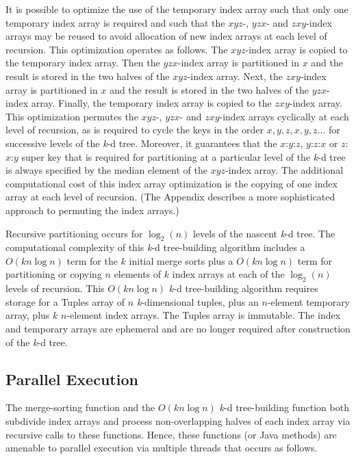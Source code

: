\documentclass{sig-alternate}
\begin{document}
It is possible to optimize the use of the temporary index array such that only one temporary index array is required and such that the $xyz$-, $yzx$- and $zxy$-index arrays may be reused to avoid allocation of new index arrays at each level of recursion.  This optimization operates as follows.  The $xyz$-index array is copied to the temporary index array.  Then the $yzx$-index array is partitioned in $x$ and the result is stored in the two halves of the $xyz$-index array.  Next, the $zxy$-index array is partitioned in $x$ and the result is stored in the two halves of the $yzx$-index array.  Finally, the temporary index array is copied to the $zxy$-index array.  This optimization permutes the $xyz$-, $yzx$- and $zxy$-index arrays cyclically at each level of recursion, as is required to cycle the keys in the order $x,y,z,x,y,z...$ for successive levels of the \emph{k}-d tree.  Moreover, it guarantees that the $x$:$y$:$z$, $y$:$z$:$x$ or $z$:$x$:$y$ super key that is required for partitioning at a particular level of the \emph{k}-d tree is always specified by the median element of the $xyz$-index array.  The additional computational cost of this index array optimization is the copying of one index array at each level of recursion. (The Appendix describes a more sophisticated approach to permuting the index arrays.)

Recursive partitioning occurs for $\log_2 \left(n\right)$ levels of the nascent \emph{k}-d tree.  The computational complexity of this \emph{k}-d tree-building algorithm includes a $O\left(kn \log n\right)$ term for the $k$ initial merge sorts plus a $O\left(kn \log n\right)$ term for partitioning or copying $n$ elements of $k$ index arrays at each of the $\log_2 \left(n\right)$ levels of recursion.  This $O\left(kn \log n\right)$ \emph{k}-d tree-building algorithm requires storage for a Tuples array of $n$ \emph{k}-dimensional tuples, plus an $n$-element temporary array, plus $k$ $n$-element index arrays.  The Tuples array is immutable.  The index and temporary arrays are ephemeral and are no longer required after construction of the \emph{k}-d tree.

\subsection{Parallel Execution}
\label{sec:parallel_execution}

The merge-sorting function \cite{Sedgewick} and the $O\left(kn \log n\right)$ \emph{k}-d tree-building function both subdivide index arrays and process non-overlapping halves of each index array via recursive calls to these functions.  Hence, these functions (or Java methods) are amenable to parallel execution via multiple threads that occurs as follows.
\end{document}
